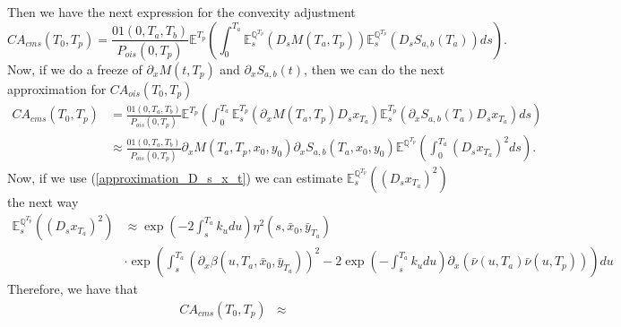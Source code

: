 \documentclass[a4paper,10pt]{article}
\newcommand{\1}{\mathbf{1}}
\begin{document}
Then we have the next expression for the convexity adjustment
\begin{equation*}
CA_{cms}(T_0,T_p) = \frac{01(0,T_a,T_b)}{P_{ois}(0,T_p)} \mathbb{E}^{T_p}\left(\int_{0}^{T_a} \mathbb{E}_s^{\mathbb{Q}^{T_p}}\left(D_s M(T_a,T_p)\right) \mathbb{E}_s^{\mathbb{Q}^{T_p}}\left(D_s S_{a,b}(T_a)\right) ds  \right).
\end{equation*}
Now, if we do a freeze of $\partial_x M(t,T_p)$ and $\partial_x S_{a,b}(t)$, then we can do the next approximation for $CA_{ois}(T_0,T_p)$
\begin{align*}
CA_{cms}(T_0,T_p) &=  \frac{01(0,T_a,T_b)}{P_{ois}(0,T_p)} \mathbb{E}^{T_p}\left(\int_{0}^{T_a} \mathbb{E}^{T_p}_s \left(\partial_x M(T_a,T_p) D_s x_{T_a}\right) \mathbb{E}^{T_p}_s \left(\partial_x S_{a,b}(T_a)D_s x_{T_a} \right) ds \right) \\
& \approx \frac{01(0,T_a,T_b)}{P_{ois}(0,T_p)} \partial_x M(T_a,T_p, x_0, y_0)  \partial_x S_{a,b}(T_a,x_0,y_0) \mathbb{E}^{\mathbb{Q}^{T_p}}\left(\int_{0}^{T_a} \left(D_s x_{T_a} \right)^{2} ds \right).
\end{align*}
Now, if we use (\ref{approximation_D_s_x_t}) we can estimate  
$
 \mathbb{E}_s^{\mathbb{Q}^{T_p}}\left(\left(D_s x_{T_a} \right)^{2}\right)
$
the next way 
\begin{align*} 
\mathbb{E}_s^{\mathbb{Q}^{T_p}}\left(\left(D_s x_{T_a} \right)^{2}\right) &\approx \exp\left(-2 \int_{s}^{T_a}k_u du \right) \eta^{2}(s,\bar{x}_0,\bar{y}_{T_a}) \\
& \cdot \exp\left(\int_{s}^{T_a} \left(\partial_x \beta(u,T_a,\bar{x}_0,\bar{y}_{T_a})\right)^{2} - 2 \exp\left(-\int_{s}^{T_a}k_u du\right) \partial_x (\bar{\nu}(u,T_a) \bar{\nu}(u,T_p)) \right) du
\end{align*}
Therefore, we have that
\begin{align*}
CA_{cms}(T_0,T_p) &\approx 
\end{align*}
\end{document}
